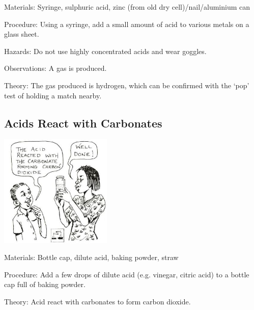 \begin{multicols}{2}
\begin{description*}
\item[Materials:]{Syringe, sulphuric acid, zinc (from old dry cell)/nail/aluminium can}
\item[Procedure:]{Using a syringe, add a small amount of acid to various metals on a glass sheet.}
\item[Hazards:]{Do not use highly concentrated acids and wear goggles.}
\item[Observations:]{A gas is produced.}
\item[Theory:]{The gas produced is hydrogen, which can be confirmed with the `pop' test of holding a match nearby.}
\end{description*}

\subsection{Acids React with Carbonates}

\begin{center}
\includegraphics[width=0.4\textwidth]{./img/source/acids-bases.jpg}
\end{center}

\begin{description*}
\item[Materials:]{Bottle cap, dilute acid, baking powder, straw}
\item[Procedure:]{Add a few drops of dilute acid (e.g. vinegar, citric acid) to a bottle cap full of baking powder.}
\item[Theory:]{Acid react with carbonates to form carbon dioxide.}
\end{description*}


\end{multicols}
